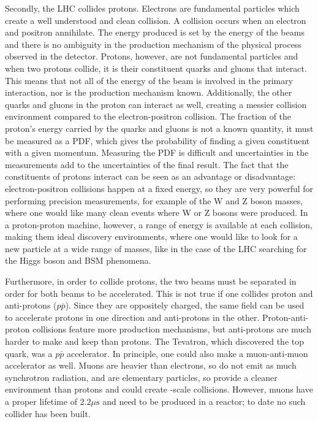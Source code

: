 Secondly, the \ac{LHC} collides protons. Electrons are fundamental particles which create a well understood and clean collision. A collision occurs when an electron and positron annihilate. The energy produced is set by the energy of the beams and there is no ambiguity in the production mechanism of the physical process observed in the detector. Protons, however, are not fundamental particles and when two protons collide, it is their constituent quarks and gluons that interact. This means that not all of the energy of the beam is involved in the primary interaction, nor is the production mechanism known. Additionally, the other quarks and gluons in the proton can interact as well, creating a messier collision environment compared to the electron-positron collision. The fraction of the proton's energy carried by the quarks and gluons is not a known quantity, it must be measured as a \ac{PDF}, which gives the probability of finding a given constituent with a given momentum. Measuring the \ac{PDF} is difficult and uncertainties in the measurements add to the uncertainties of the final result. The fact that the constituents of protons interact can be seen as an advantage or disadvantage: electron-positron collisions happen at a fixed energy, so they are very powerful for performing precision measurements, for example of the W and Z boson masses, where one would like many clean events where W or Z bosons were produced. In a proton-proton machine, however, a range of energy is available at each collision, making them ideal discovery environments, where one would like to look for a new particle at a wide range of masses, like in the case of the \ac{LHC} searching for the Higgs boson and \ac{BSM} phenomena. 

Furthermore, in order to collide protons, the two beams must be separated in order for both beams to be accelerated. This is not true if one collides proton and anti-protons ($p\bar{p}$). Since they are oppositely charged, the same field can be used to accelerate protons in one direction and anti-protons in the other. Proton-anti-proton collisions feature more production mechanisms, but anti-protons are much harder to make and keep than protons. The Tevatron, which discovered the top quark, was a $p\bar{p}$ accelerator. In principle, one could also make a muon-anti-muon accelerator as well. Muons are heavier than electrons, so do not emit as much synchrotron radiation, and are elementary particles, so provide a cleaner environment than protons and could create \TeV-scale collisions. However, muons have a proper lifetime of $2.2 \mu\textrm{s}$ and need to be produced in a reactor; to date no such collider has been built. 

